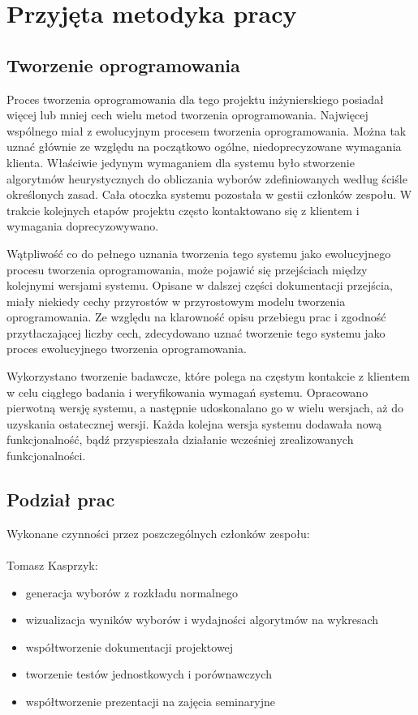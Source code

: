 \documentclass[pdflatex,11pt]{../aghdoc_version2}
\newlength\tindent
\renewcommand{\indent}{\hspace*{\tindent}}
\begin{document}
\chapter{Przyjęta metodyka pracy}
\section{Tworzenie oprogramowania}
Proces tworzenia oprogramowania dla tego projektu inżynierskiego posiadał więcej lub mniej
cech wielu metod tworzenia oprogramowania. Najwięcej wspólnego miał z ewolucyjnym
procesem tworzenia oprogramowania. Można tak uznać głównie ze względu na początkowo
ogólne, niedoprecyzowane wymagania klienta. Właściwie jedynym wymaganiem dla
systemu było stworzenie algorytmów heurystycznych do obliczania wyborów zdefiniowanych
według ściśle określonych zasad. Cała otoczka systemu pozostała w gestii członków
zespołu. W trakcie kolejnych etapów projektu często kontaktowano się z klientem i
wymagania doprecyzowywano. 

\indent Wątpliwość co do pełnego uznania tworzenia tego systemu
jako ewolucyjnego procesu tworzenia oprogramowania, może pojawić się przejściach
między kolejnymi wersjami systemu. Opisane w dalszej części dokumentacji przejścia, miały niekiedy cechy przyrostów w przyrostowym modelu tworzenia oprogramowania. Ze względu na klarowność opisu przebiegu prac i zgodność przytłaczającej liczby cech, zdecydowano uznać tworzenie tego systemu jako proces
ewolucyjnego tworzenia oprogramowania.

\indent Wykorzystano tworzenie badawcze, które polega na częstym kontakcie z klientem w celu
ciągłego badania i weryfikowania wymagań systemu. Opracowano pierwotną wersję
systemu, a następnie udoskonalano go w wielu wersjach, aż do uzyskania ostatecznej
wersji. Każda kolejna wersja systemu dodawała nową funkcjonalność, bądź przyspieszała
działanie wcześniej zrealizowanych funkcjonalności.

\section{Podział prac}
Wykonane czynności przez poszczególnych członków zespołu: \\ \\
Tomasz Kasprzyk:
\begin{itemize}
\item generacja wyborów z rozkładu normalnego
\item wizualizacja wyników wyborów i wydajności algorytmów na wykresach
\item współtworzenie dokumentacji projektowej
\item tworzenie testów jednostkowych i porównawczych
\item współtworzenie prezentacji na zajęcia seminaryjne
\end{itemize}
\end{document}

